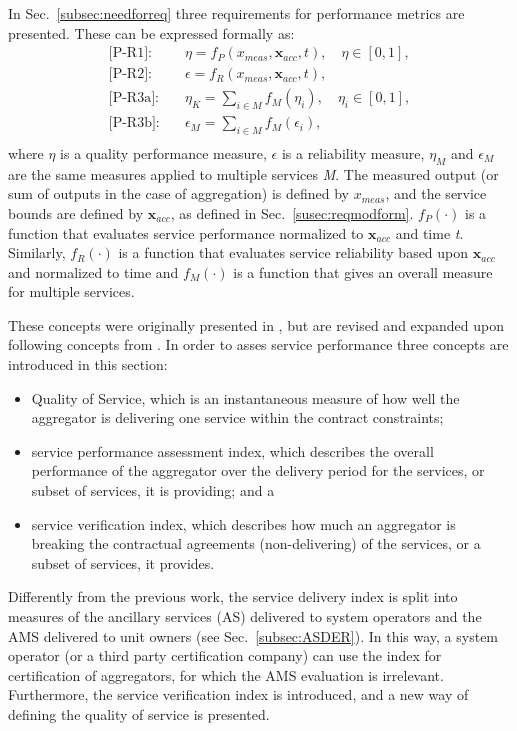 In Sec.~\ref{subsec:needforreq} three requirements for performance metrics are presented. These can be expressed formally as:
\begin{align}
    \text{[P-R1]:} \quad & \eta = f_P(x_{meas},\mathbf{x}_{acc},t), \quad \eta \in [0,1],\\
    \text{[P-R2]:} \quad & \epsilon = f_R(x_{meas},\mathbf{x}_{acc},t),\\
    \text{[P-R3a]:} \quad & \eta_K = \sum_{i \in M} f_M(\eta_i), \quad \eta_i \in [0,1],\\
    \text{[P-R3b]:} \quad & \epsilon_M = \sum_{i \in M} f_M(\epsilon_i),\\
\end{align}
where $\eta$ is a quality performance measure, $\epsilon$ is a reliability measure, $\eta_M$ and $\epsilon_M$ are the same measures applied to multiple services \emph{M}. The measured output (or sum of outputs in the case of aggregation) is defined by $x_{meas}$, and the service bounds are defined by $\mathbf{x}_{acc}$, as defined in Sec.~\ref{susec:reqmodform}. $f_P(\cdot)$ is a function that evaluates service performance normalized to $\mathbf{x}_{acc}$ and time \emph{t}. Similarly, $f_R(\cdot)$ is a function that evaluates service reliability based upon $\mathbf{x}_{acc}$ and normalized to time and $f_M(\cdot)$ is a function that gives an overall measure for multiple services.

These concepts were originally presented in \cite{bondy2014performance}, but are revised and expanded upon following concepts from \cite{thavlov2015thesis}. In order to asses service performance three concepts are introduced in this section:
\begin{itemize}
\item Quality of Service, which is an instantaneous measure of how well the aggregator is delivering one service within the contract constraints;
\item service performance assessment index, which describes the overall performance of the aggregator over the delivery period for the services, or subset of services, it is providing; and a
\item service verification index, which describes how much an aggregator is breaking the contractual agreements (non-delivering) of the services, or a subset of services, it provides.
\end{itemize}

Differently from the previous work, the service delivery index is split into measures of the ancillary services (AS) delivered to system operators and the AMS delivered to unit owners (see Sec.~\ref{subsec:ASDER}). In this way, a system operator (or a third party certification company) can use the index for certification of aggregators, for which the AMS evaluation is irrelevant. Furthermore, the service verification index is introduced, and a new way of defining the quality of service is presented.


